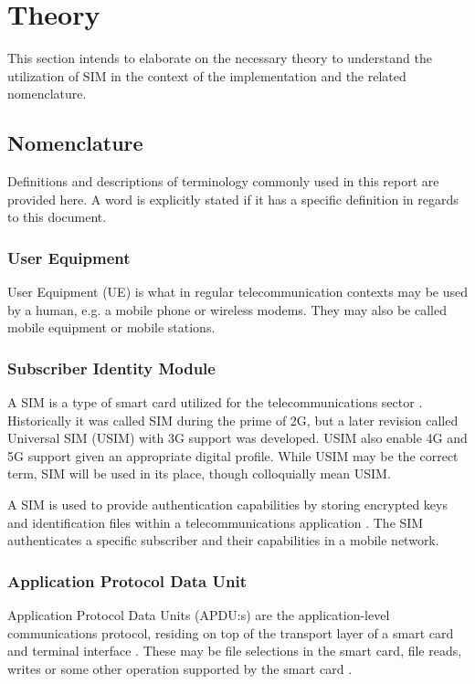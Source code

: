 \section{Theory}

This section intends to elaborate on the necessary theory to
understand the utilization of SIM in the context of the
implementation and the related nomenclature.

\subsection{Nomenclature}

Definitions and descriptions of terminology commonly used in this
report are provided here. A word is explicitly stated if it has
a specific definition in regards to this document.

\subsubsection{User Equipment}

User Equipment (UE) is what in regular telecommunication contexts
may be used by a human, e.g. a mobile phone or wireless modems.
They may also be called mobile equipment or mobile stations.

\subsubsection{Subscriber Identity Module}

A SIM is a type of smart card utilized for the telecommunications sector
\cite{etsi-ts-131-102}. Historically it was called SIM during the prime of 2G,
but a later revision called Universal SIM (USIM) with 3G \cite{etsi-ts-131-102}
support was developed. USIM also enable 4G and 5G support given an
appropriate digital profile. While USIM may be the correct term, SIM
will be used in its place, though colloquially mean USIM.

A SIM is used to provide authentication capabilities by storing
encrypted keys and identification files within a telecommunications
application \cite{etsi-ts-131-102}. The SIM authenticates a
specific subscriber and their capabilities in a mobile network.

\subsubsection{Application Protocol Data Unit}

Application Protocol Data Units (APDU:s) are the application-level
communications protocol, residing on top of the transport layer of
a smart card and terminal interface \cite{etsi-ts-102-221}. These
may be file selections in the smart card, file reads, writes or
some other operation supported by the smart card \cite{etsi-ts-102-221}.

